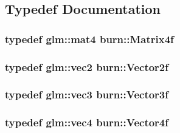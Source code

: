 \subsection{Typedef Documentation}
\hypertarget{namespaceburn_a643e9d2ffceb4304e3755a100268a7a3}{
\subsubsection[{Matrix4f}]{\setlength{\rightskip}{0pt plus 5cm}typedef glm\-::mat4 {\bf burn\-::\-Matrix4f}}}\label{namespaceburn_a643e9d2ffceb4304e3755a100268a7a3}
\hypertarget{namespaceburn_a2af71ec5609a2f2d501827804e86a9b8}{
\subsubsection[{Vector2f}]{\setlength{\rightskip}{0pt plus 5cm}typedef glm\-::vec2 {\bf burn\-::\-Vector2f}}}\label{namespaceburn_a2af71ec5609a2f2d501827804e86a9b8}
\hypertarget{namespaceburn_a9d6d349c94bc4dc9699427216128a0ef}{
\subsubsection[{Vector3f}]{\setlength{\rightskip}{0pt plus 5cm}typedef glm\-::vec3 {\bf burn\-::\-Vector3f}}}\label{namespaceburn_a9d6d349c94bc4dc9699427216128a0ef}
\hypertarget{namespaceburn_a2907b7b4adbde67cc68c401d9a30bdfe}{
\subsubsection[{Vector4f}]{\setlength{\rightskip}{0pt plus 5cm}typedef glm\-::vec4 {\bf burn\-::\-Vector4f}}}\label{namespaceburn_a2907b7b4adbde67cc68c401d9a30bdfe}


